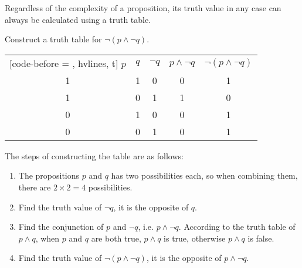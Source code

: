 \documentclass{report}
\newcounter{example}
\begin{document}
Regardless of the complexity of a proposition, its truth value in any case can
always be calculated using a truth table. \vspace{0.5cm}
\begin{example}
    \item Construct a truth table for $\neg(p\land\neg q)$.
\end{example}
\begin{solution}
    \item
    \begin{NiceTabular}{|c|c|c|c|c|}[code-before = , hvlines, t]
        $p$ & $q$ & $\neg q$ & $p \land \neg q$ & $\neg(p \land \neg q)$ \\
        1   & 1   & 0        & 0                & 1                      \\
        1   & 0   & 1        & 1                & 0                      \\
        0   & 1   & 0        & 0                & 1                      \\
        0   & 0   & 1        & 0                & 1                      \\
    \end{NiceTabular}
\end{solution}

The steps of constructing the table are as follows:
\begin{enumerate}[leftmargin=*, label=\indent(\arabic*)]
    \item The propositions $p$ and $q$ has two possibilities each, so when combining
          them, there are $2 \times 2 = 4$ possibilities.
    \item Find the truth value of $\neg q$, it is the opposite of $q$.
    \item Find the conjunction of $p$ and $\neg q$, i.e. $p \land \neg q$. According to
          the truth table of $p \land q$, when $p$ and $q$ are both true, $p \land q$ is
          true, otherwise $p \land q$ is false.
    \item Find the truth value of $\neg(p \land \neg q)$, it is the opposite of $p \land
              \neg q$.
\end{enumerate}
\end{document}
